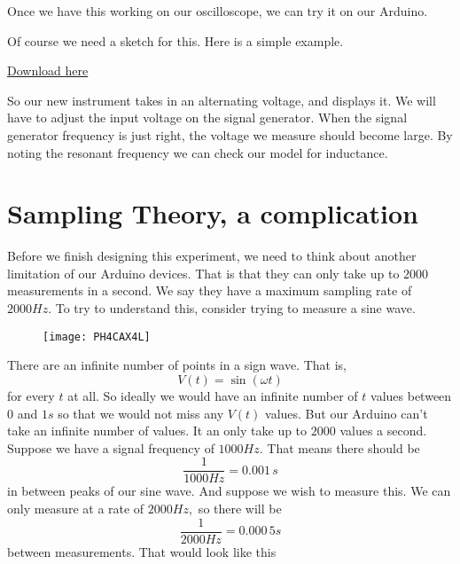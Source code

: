 Once we have this working on our oscilloscope, we can try it on our Arduino.

Of course we need a sketch for this. Here is a simple example.

\href{https://dtoliphant.github.io/PH250Manual/Code/RLCPart2_pm5Vsignal.ino}{Download here}




So our new instrument takes in an alternating voltage, and displays it. We
will have to adjust the input voltage on the signal generator. When the
signal generator frequency is just right, the voltage we measure should
become large. By noting the resonant frequency we can check our model for
inductance.

\section{Sampling Theory, a complication}

Before we finish designing this experiment, we need to think about another
limitation of our Arduino devices. That is that they can only take up to $%
2000$ measurements in a second. We say they have a maximum sampling rate of $%
2000\unit{Hz}.$ To try to understand this, consider trying to measure a sine
wave.

\begin{figure}[h!]
\texttt{[image: PH4CAX4L]}
\end{figure}There are an infinite number of
points in a sign wave. That is, 
\begin{equation*}
V\left( t\right) =\sin \left( \omega t\right)
\end{equation*}%
for every $t$ at all. So ideally we would have an infinite number of $t$
values between $0$ and $1\unit{s}$ so that we would not miss any $V\left(
t\right) $ values. But our Arduino can't take an infinite number of values.
It an only take up to $2000$ values a second. Suppose we have a signal
frequency of $1000\unit{Hz}.$ That means there should be 
\begin{equation*}
\frac{1}{1000\unit{Hz}}=0.001\,\unit{s}
\end{equation*}
in between peaks of our sine wave. And suppose we wish to measure this. We
can only measure at a rate of $2000\unit{Hz},$ so there will be 
\begin{equation*}
\frac{1}{2000\unit{Hz}}=0.000\,5\unit{s}
\end{equation*}
between measurements. That would look like this

